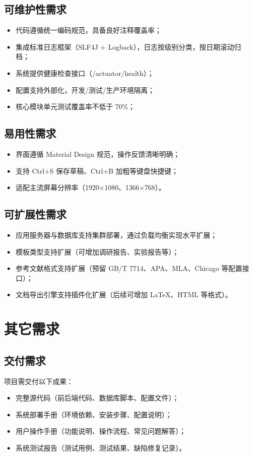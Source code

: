 \documentclass{softeng}
\begin{document}
\subsection{可维护性需求}
	\begin{itemize}
		\item 代码遵循统一编码规范，具备良好注释覆盖率；
		\item 集成标准日志框架（SLF4J + Logback），日志按级别分类，按日期滚动归档；
		\item 系统提供健康检查接口（/actuator/health）；
		\item 配置支持外部化，开发/测试/生产环境隔离；
		\item 核心模块单元测试覆盖率不低于 70\%；
	\end{itemize}

\subsection{易用性需求}
	\begin{itemize}
		\item 界面遵循 Material Design 规范，操作反馈清晰明确；
		\item 支持 Ctrl+S 保存草稿、Ctrl+B 加粗等键盘快捷键；
		\item 适配主流屏幕分辨率（1920×1080、1366×768）。
	\end{itemize}
	
\subsection{可扩展性需求}
	\begin{itemize}
		\item 应用服务器与数据库支持集群部署，通过负载均衡实现水平扩展；
		\item 模板类型支持扩展（可增加调研报告、实验报告等）；
		\item 参考文献格式支持扩展（预留 GB/T 7714、APA、MLA、Chicago 等配置接口）；
		\item 文档导出引擎支持插件化扩展（后续可增加 LaTeX、HTML 等格式）。
	\end{itemize}
	
	
\section{其它需求}
\subsection{交付需求}
	项目需交付以下成果：
	\begin{itemize}
		\item 完整源代码（前后端代码、数据库脚本、配置文件）；
		\item 系统部署手册（环境依赖、安装步骤、配置说明）；
		\item 用户操作手册（功能说明、操作流程、常见问题解答）；
		\item 系统测试报告（测试用例、测试结果、缺陷修复记录）。
	\end{itemize}
	
\end{document}
